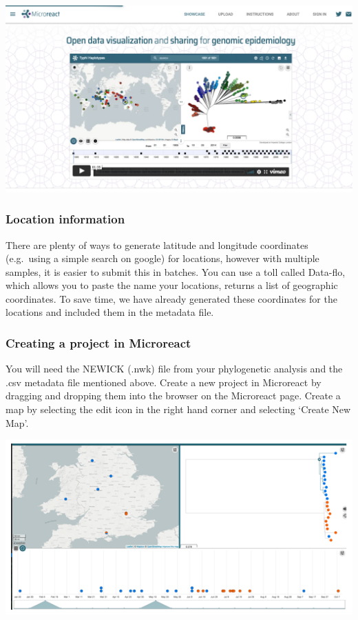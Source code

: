 \documentclass[11pt]{article}
\begin{document}
\begin{center}
\includegraphics[Microreact]{img/microreact.png}
\end{center}


\hypertarget{location-information}{%
\subsubsection{Location information}\label{location-information}}

There are plenty of ways to generate latitude and longitude coordinates
(e.g.~using a simple search on google) for locations, however with
multiple samples, it is easier to submit this in batches. You can use a
toll called Data-flo, which allows you to paste the name your locations,
returns a list of geographic coordinates. To save time, we have already
generated these coordinates for the locations and included them in the
metadata file.

\hypertarget{creating-a-project-in-microreact}{%
\subsubsection{Creating a project in
Microreact}\label{creating-a-project-in-microreact}}

You will need the NEWICK (.nwk) file from your phylogenetic analysis and
the .csv metadata file mentioned above. Create a new project in
Microreact by dragging and dropping them into the browser on the
Microreact page. Create a map by selecting the edit icon in the right
hand corner and selecting `Create New Map'.


\begin{center}
\includegraphics[Data in microreact]{img/microreact-data.png}
\end{center}
\end{document}
